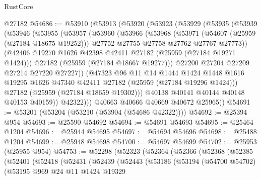 \begin{lexlean}{RustCore}
\begin{coremodule}
    @27182
@54686 := @53910
    (@53913
      (@53920
        (@53923
          (@53929
            (@53935
              (@53939
                (@53946
                  (@53955
                    (@53957
                      (@53960
                        (@53966
                          (@53968
                            (@53971
                              (@54607 (@25959 (@27184 @18675 @19252)))
                              @27752
                              @27755
                              @27758
                              @27762
                              @27767
                              @27773))
                          (@42406 @19270 @1626 @42398 @42411 @27182 (@25959 (@27184 @19271 @1424)))
                          @27182
                          (@25959 (@27184 @18667 @19277)))
                        @27200
                        @27204
                        @27209
                        @27214
                        @27220
                        @27227))
                    (@47323
                      @96
                      @11
                      @14
                      @1444
                      @1424
                      @1448
                      @1616
                      @19295
                      @1626
                      @47340
                      @42411
                      @27182
                      (@25959 (@27184 @19296 @1424)))
                    @27182
                    (@25959 (@27184 @18659 @19302)))
                  @40138
                  @40141
                  @40144
                  @40148
                  @40153
                  @40159))
              @42322)))
        @40663
        @40666
        @40669
        @40672
        @25965))
@54691 := @53201 (@53204 (@53210 (@53904 (@54686 @42322))))
@54692 := @25394 @954
@54693 := @25590 @54692
@54694 := @54691 @54693
@54695 := @25464 @1204
@54696 := @25944 @54695
@54697 := @54694 @54696
@54698 := @25488 @1204
@54699 := @25948 @54698
@54700 := @54697 @54699
@54702 := @25953 (@25955 @954)
@54753 := @52298
    (@52323
      (@52364
        (@52366
          (@52368
            (@52385
              (@52401
                (@52418
                  (@52431
                    (@52439
                      (@52443
                        (@53186
                          (@53194
                            (@54700 @54702)
                            (@53195
                              @969
                              @24
                              @11
                              @1424
                              @19329

\end{coremodule}
\end{lexlean}
